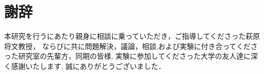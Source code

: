 \chapter*{謝辞}
本研究を行うにあたり親身に相談に乗っていただき，ご指導してくださった萩原将文教授，
ならびに共に問題解決，議論，相談,および実験に付き合ってくださった研究室の先輩方，同期の皆様,
実験に参加してくださった大学の友人達に深く感謝いたします.
誠にありがとうございました．